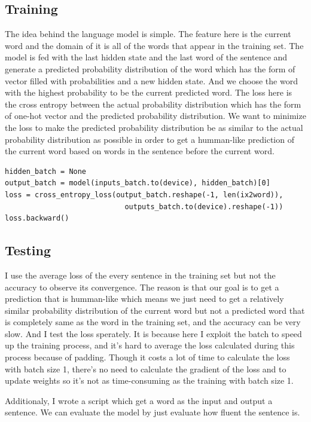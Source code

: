 \documentclass[UTF8, a4paper, 11pt]{article}
\begin{document}
\subsection{Training}
The idea behind the language model is simple. The feature here is the current word and the domain of it is all of the words that appear in the training set.
The model is fed with the last hidden state and the last word of the sentence and generate a predicted probability distribution of the word
which has the form of vector filled with probabilities and a new hidden state. And we choose the word with the highest probability to be the current predicted word.
The loss here is the cross entropy between the actual probability distribution which has the form of one-hot vector and the predicted probability distribution.
We want to minimize the loss to make the predicted probability distribution be as similar to the actual probability distribution as possible in order to get
a humman-like prediction of the current word based on words in the sentence before the current word.
\begin{lstlisting}
hidden_batch = None
output_batch = model(inputs_batch.to(device), hidden_batch)[0]
loss = cross_entropy_loss(output_batch.reshape(-1, len(ix2word)),
							outputs_batch.to(device).reshape(-1))
loss.backward()
\end{lstlisting}

\subsection{Testing}
I use the average loss of the every sentence in the training set but not the accuracy to observe its convergence.
The reason is that our goal is to get a prediction that is humman-like which means we just need to get a relatively similar probability distribution of
the current word but not a predicted word that is completely same as the word in the training set, and the accuracy can be very slow.
And I test the loss sperately. It is because here I exploit the batch to speed up the training process,
and it's hard to average the loss calculated during this process because of padding.
Though it costs a lot of time to calculate the loss with batch size 1, there's no need to calculate the gradient of the loss and to update weights so it's not as
time-consuming as the training with batch size 1.

Additionaly, I wrote a script which get a word as the input and output a sentence. We can evaluate the model by just evaluate how fluent the sentence is.
\end{document}
